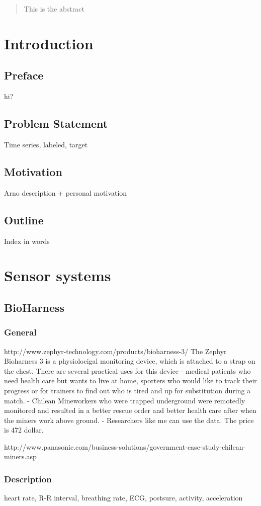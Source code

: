 \begin{abstract}
This is the abstract

\end{abstract}

\section{Introduction}
	\subsection{Preface}
		hi?
	\subsection{Problem Statement}
		Time series, labeled, target
	\subsection{Motivation}
		Arno description + personal motivation
	\subsection{Outline}
		Index in words
\section{Sensor systems}
	\subsection{BioHarness}
		\subsubsection{General}
			http://www.zephyr-technology.com/products/bioharness-3/	
			The Zephyr Bioharness 3 is a physiolocigal monitoring device, which is attached to a strap on the chest. There are several practical uses for this device - medical patients who need health care but wants to live at home, sporters who would like to track their progress or for trainers to find out who is tired and up for substitution during a match.
			- Chilean Mineworkers who were trapped underground were remotedly monitored and resulted in a better rescue order and better health care after when the miners work above ground.
			- Researchers like me can use the data.
			The price is 472 dollar.
		
	http://www.panasonic.com/business-solutions/government-case-study-chilean-miners.asp	
		\subsubsection{Description}
			heart rate, R-R interval, breathing rate, ECG, postsure, activity, acceleration

